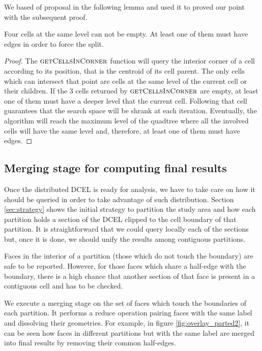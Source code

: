We based of proposal in the following lemma and used it to proved our point with the subsequent proof.

\begin{lemma}
Four cells at the same level can not be empty.  At least one of them must have edges in order to force the split.
\end{lemma}

\begin{proof}
The $\textsc{getCellsInCorner}$ function will query the interior corner of a cell according to its position, that is the centroid of its cell parent.  The only cells which can intersect that point are cells at the same level of the current cell or their children.  If the 3 cells returned by $\textsc{getCellsInCorner}$ are empty, at least one of them must have a deeper level that the current cell.  Following that cell guarantees that the search space will be shrank at each iteration.  Eventually, the algorithm will reach the maximum level of the quadtree where all the involved cells will have the same level and, therefore, at least one of them must have edges.
\end{proof}

\subsection{Merging stage for computing final results} \label{sec:merge}
Once the distributed DCEL is ready for analysis, we have to take care on how it should be queried in order to take advantage of such distribution.  Section \ref{sec:strategy} shows the initial strategy to partition the study area and how each partition holds a section of the DCEL clipped to the cell boundary of that partition.  It is straightforward that we could query locally each of the sections but, once it is done, we should unify the results among contiguous partitions.

Faces in the interior of a partition (those which do not touch the boundary) are safe to be reported.  However, for those faces which share a half-edge with the boundary, there is a high chance that another section of that face is present in a contiguous cell and has to be checked.  

We execute a merging stage on the set of faces which touch the boundaries of each partition.  It performs a reduce operation pairing faces with the same label and dissolving their geometries.  For example, in figure \ref{fig:overlay_parted2}, it can be seen how faces in different partitions but with the same label are merged into final results by removing their common half-edges. 

